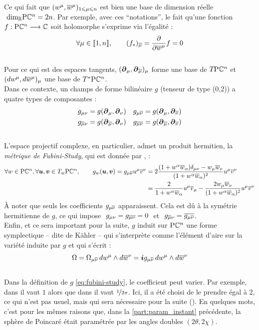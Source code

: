 Ce qui fait que $(w^\mu, \congu{w}^\mu)_{1\leq \mu \leq n}$ est bien une base de dimension réelle $\ \dim[\R]\PC{n} = 2n$. Par exemple, avec ces ``notations'', le fait qu'une fonction $f: \PC{n}\lr \C$ soit holomorphe s'exprime via l'égalité :
\[\forall \mu\in\llbracket1,n\rrbracket,\qquad (f_*)_{\congu{\mu}} = \frac{\partial}{\partial \congu{w}^\mu}f = 0\] 
\\
Pour ce qui est des espaces tangents, $(\bt_\mu, \bt_{\congu{\mu}})_\mu$ forme une base de $\tg{\PC{n}}$ et $(dw^\mu, d\congu{w}^\mu)_\mu$ une base de $\tg{^* \PC{n}}$.
\\
Dans ce contexte, un champs de forme bilinéaire $g$ (tenseur de type (0,2)) a quatre types de composantes :
\begin{align*}
	g_{\mu \nu} &= g(\bt_{\mu}, \bt_{\nu})  &  g_{\mu \congu{\nu}} &= g(\bt_{\mu}, \bt_{\congu{\nu}}) \\
	g_{\congu{\mu} \nu} &= g(\bt_{\congu{\mu}}, \bt_{\nu})  &  g_{\congu{\mu} \congu{\nu}} &= g(\bt_{\congu{\mu}}, \bt_{\congu{\nu}})
\end{align*}
\\
L'espace projectif complexe, en particulier, admet un produit hermitien, la \emph{métrique de Fubini-Study}, qui est donnée par \cite[sec. 8.5]{nakahara_geometry_2003}, \cite[chap. 4]{ballmann_lectures_2006} :
\begin{equation} \label{eq:fubini-study}
	\begin{aligned}
		\forall w\in\PC{n}, \forall \bf{u},\bf{v}\in\tg[w]{\PC{n}},\qquad g_w(\bf{u}, \bf{v}) = g_{\mu\congu{\nu}} u^\mu \congu{v}^\nu 
		&= 2\frac{(1+w^\alpha \congu{w}_\alpha)\delta_{\mu\nu} - w_\mu \congu{w}_\nu}{(1+w^\alpha \congu{w}_\alpha)^2}u^\mu \congu{v}^\nu \\
		&= \frac{2}{1+w^\alpha \congu{w}_\alpha} u^\mu \congu{v}_\mu - \frac{2w_\mu \congu{w}_\nu}{(1+w^\alpha \congu{w}_\alpha)^2} u^\mu \congu{v}^\nu
	\end{aligned}
\end{equation}
À noter que seuls les coefficients $g_{\mu \congu{\nu}}$ apparaissent. Cela est dû à la symétrie hermitienne de $g$, ce qui impose $\ g_{\mu\nu} = g_{\congu{\mu\nu}} = 0\ $ et $\ g_{\congu{\mu} \nu} = \congu{g_{\mu \congu{\nu}}}$.
\\
Enfin, et ce sera important pour la suite, $g$ induit sur $\PC{n}$ une forme symplectique -- dite de Kähler -- qui s'interprète comme l'élément d'aire sur la variété induite par $g$ et qui s'écrit :
\[\Omega = \Omega_{\mu\congu{\nu}}\, dw^\mu \wedge d\congu{w}^\nu 
= \i g_{\mu \congu{\nu}}\, dw^\mu \wedge d\congu{w}^\nu\]
\\
Dans la définition de $g$ \eqref{eq:fubini-study}, le coefficient peut varier. Par exemple, dans \cite{nakahara_geometry_2003} il vaut $1$ alors que dans \cite{huybrechts_complex_2005} il vaut $\nicefrac{1}{2\pi}$. 
Ici, il a été choisi de le prendre égal à 2, ce qui n'est pas usuel, mais qui sera nécessaire pour la suite ().
En quelques mots, c'est pour les mêmes raisons que, dans la \cref{part:param_instant} précédente, la sphère de Poincaré était paramétrée par les angles doubles $(2\theta, 2\chi)$.
\skipl





